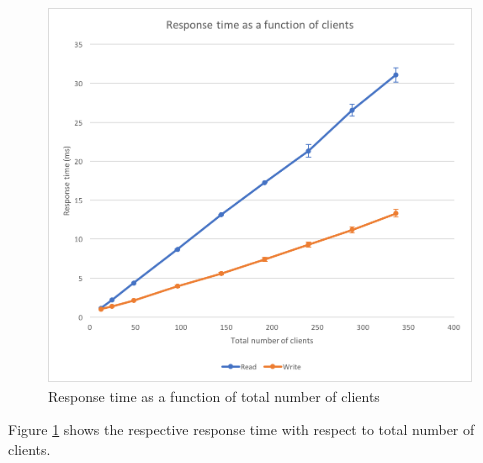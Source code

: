 \documentclass[11pt,a4paper]{article}
\begin{document}
\begin{figure}[!h]
\begin{minipage}[b]{.45\textwidth}
        \includegraphics[width=\textwidth]{processing/graphics/bench_memcached_latency-clients.png}
        \caption{Response time as a function of total number of clients}
        \label{png::bench_memcached_latency-clients}
    \end{minipage}
\end{figure}

Figure \ref{png::bench_memcached_latency-clients} shows the respective response time with respect to total number of clients.
\end{document}
